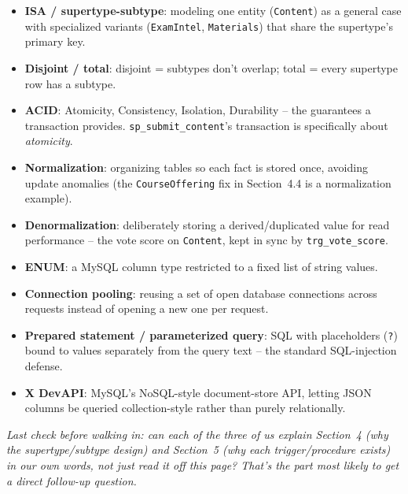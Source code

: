 \documentclass[11pt]{article}
\newenvironment{tightlist}{\begin{itemize}[leftmargin=1.4em,itemsep=2pt,topsep=2pt]}{\end{itemize}}
\begin{document}
\begin{tightlist}
  \item \textbf{ISA / supertype-subtype}: modeling one entity (\texttt{Content}) as a general case with specialized variants (\texttt{ExamIntel}, \texttt{Materials}) that share the supertype's primary key.
  \item \textbf{Disjoint / total}: disjoint = subtypes don't overlap; total = every supertype row has a subtype.
  \item \textbf{ACID}: Atomicity, Consistency, Isolation, Durability -- the guarantees a transaction provides. \texttt{sp\_submit\_content}'s transaction is specifically about \emph{atomicity}.
  \item \textbf{Normalization}: organizing tables so each fact is stored once, avoiding update anomalies (the \texttt{CourseOffering} fix in Section~4.4 is a normalization example).
  \item \textbf{Denormalization}: deliberately storing a derived/duplicated value for read performance -- the vote score on \texttt{Content}, kept in sync by \texttt{trg\_vote\_score}.
  \item \textbf{ENUM}: a MySQL column type restricted to a fixed list of string values.
  \item \textbf{Connection pooling}: reusing a set of open database connections across requests instead of opening a new one per request.
  \item \textbf{Prepared statement / parameterized query}: SQL with placeholders (\texttt{?}) bound to values separately from the query text -- the standard SQL-injection defense.
  \item \textbf{X DevAPI}: MySQL's NoSQL-style document-store API, letting JSON columns be queried collection-style rather than purely relationally.
\end{tightlist}

\vspace{1em}
\noindent\textit{Last check before walking in: can each of the three of us explain Section~4 (why the supertype/subtype design) and Section~5 (why each trigger/procedure exists) in our own words, not just read it off this page? That's the part most likely to get a direct follow-up question.}
\end{document}
